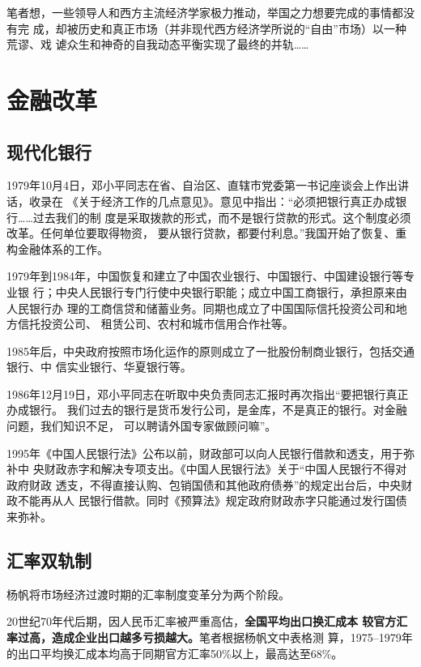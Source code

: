 笔者想，一些领导人和西方主流经济学家极力推动，举国之力想要完成的事情都没有完
成，却被历史和真正市场（并非现代西方经济学所说的“自由”市场）以一种荒谬、戏
谑众生和神奇的自我动态平衡实现了最终的并轨……


\section{金融改革}
\label{sec:huilv78}

\subsection{现代化银行}

1979年10月4日，邓小平同志在省、自治区、直辖市党委第一书记座谈会上作出讲话，收录在
《关于经济工作的几点意见》。意见中指出：“必须把银行真正办成银行……过去我们的制
度是采取拨款的形式，而不是银行贷款的形式。这个制度必须改革。任何单位要取得物资，
要从银行贷款，都要付利息。”我国开始了恢复、重构金融体系的工作。

1979年到1984年，中国恢复和建立了中国农业银行、中国银行、中国建设银行等专业银
行；中央人民银行专门行使中央银行职能；成立中国工商银行，承担原来由人民银行办
理的工商信贷和储蓄业务。同期也成立了中国国际信托投资公司和地方信托投资公司、
租赁公司、农村和城市信用合作社等。

1985年后，中央政府按照市场化运作的原则成立了一批股份制商业银行，包括交通银行、中
信实业银行、华夏银行等。

1986年12月19日，邓小平同志在听取中央负责同志汇报时再次指出“要把银行真正办成银行。
我们过去的银行是货币发行公司，是金库，不是真正的银行。对金融问题，我们知识不足，
可以聘请外国专家做顾问嘛”。

1995年《中国人民银行法》公布以前，财政部可以向人民银行借款和透支，用于弥补中
央财政赤字和解决专项支出。《中国人民银行法》关于“中国人民银行不得对政府财政
透支，不得直接认购、包销国债和其他政府债券”的规定出台后，中央财政不能再从人
民银行借款。同时《预算法》规定政府财政赤字只能通过发行国债来弥补。

\subsection{汇率双轨制}

杨帆将市场经济过渡时期的汇率制度变革分为两个阶段。\cite{huilvshi}

20世纪70年代后期，因人民币汇率被严重高估，\textbf{全国平均出口换汇成本
  较官方汇率过高，造成企业出口越多亏损越大。}笔者根据杨帆文中表格测
算，1975--1979年的出口平均换汇成本均高于同期官方汇率50\%以上，最高达至68\%。

